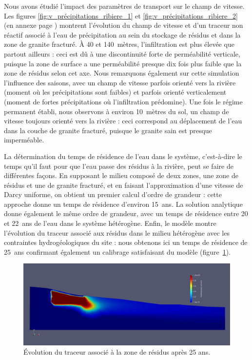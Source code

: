 \documentclass{article}
\begin{document}
Nous avons étudié l'impact des paramètres de transport sur le champ de vitesse. Les figures \ref{fig:v_précipitations_ribiere_1} et \ref{fig:v_précipitations_ribiere_2} (en annexe page \pageref{page:evolution_champ_vitesse}) montrent l'évolution du champ de vitesse et d'un traceur non réactif associé à l'eau de précipitation au sein du stockage de résidus et dans la zone de granite fracturé. À 40 et 140~mètres, l'infiltration est plus élevée que partout ailleurs : ceci est dû à une discontinuité forte de perméabilité verticale, puisque la zone de surface a une perméabilité presque dix fois plus faible que la zone de résidus selon cet axe. Nous remarquons également sur cette simulation l'influence des saisons, avec un champ de vitesse parfois orienté vers la rivière (moment où les précipitations sont faibles) et parfois orienté verticalement (moment de fortes précipitations où l'infiltration prédomine). Une fois le régime permanent établi, nous observons à environ 10~mètres du sol, un champ de vitesse toujours orienté vers la rivière : ceci correspond au déplacement de l'eau dans la couche de granite fracturé, puisque le granite sain est presque imperméable.

La détermination du temps de résidence de l'eau dans le système, c'est-à-dire le temps qu'il faut pour que l'eau passe des résidus à la rivière, peut se faire de différentes façons. En supposant le milieu composé de deux zones, une zone de résidus et une de granite fracturé, et en faisant l'approximation d'une vitesse de Darcy uniforme, on obtient un premier calcul d’ordre de grandeur : cette approche donne un temps de résidence d’environ 15~ans. La solution analytique \cite{runkel_solution_1996} donne également le même ordre de grandeur, avec un temps de résidence entre 20 et 22~ans de l'eau dans le système hétérogène. Enfin, le modèle montre l’évolution du traceur associé aux résidus dans le milieu hétérogène avec les contraintes hydrogéologiques du site : nous obtenons ici un temps de résidence de 25~ans confirmant également un calibrage satisfaisant du modèle (figure~\ref{hytec_hydro_25ans}).

\begin{figure}[H]
    \centering
    \includegraphics[width=0.9\linewidth]{III_B_3_8.png}
    \caption{Évolution du traceur associé à la zone de résidus après 25 ans.}
    \label{hytec_hydro_25ans}
\end{figure}
\end{document}
